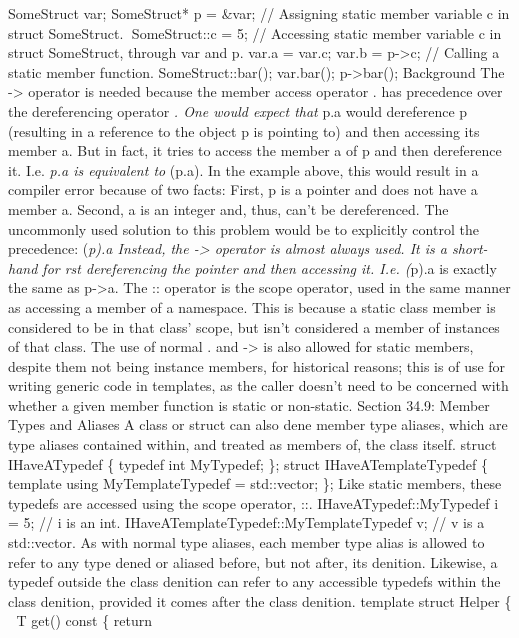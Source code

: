 SomeStruct var; SomeStruct* p = \&var; // Assigning static member
variable c in struct SomeStruct. SomeStruct::c = 5; // Accessing static
member variable c in struct SomeStruct, through var and p. var.a =
var.c; var.b = p-\textgreater c; // Calling a static member function.
SomeStruct::bar(); var.bar(); p-\textgreater bar(); Background The
-\textgreater{} operator is needed because the member access operator .
has precedence over the dereferencing operator \emph{. One would expect
that }p.a would dereference p (resulting in a reference to the object p
is pointing to) and then accessing its member a. But in fact, it tries
to access the member a of p and then dereference it. I.e. \emph{p.a is
equivalent to }(p.a). In the example above, this would result in a
compiler error because of two facts: First, p is a pointer and does not
have a member a. Second, a is an integer and, thus, can't be
dereferenced. The uncommonly used solution to this problem would be to
explicitly control the precedence: (\emph{p).a Instead, the
-\textgreater{} operator is almost always used. It is a short-hand for
rst dereferencing the pointer and then accessing it. I.e. (}p).a is
exactly the same as p-\textgreater a. The :: operator is the scope
operator, used in the same manner as accessing a member of a namespace.
This is because a static class member is considered to be in that class'
scope, but isn't considered a member of instances of that class. The use
of normal . and -\textgreater{} is also allowed for static members,
despite them not being instance members, for historical reasons; this is
of use for writing generic code in templates, as the caller doesn't need
to be concerned with whether a given member function is static or
non-static. Section 34.9: Member Types and Aliases A class or struct can
also dene member type aliases, which are type aliases contained within,
and treated as members of, the class itself. struct IHaveATypedef \{
typedef int MyTypedef; \}; struct IHaveATemplateTypedef \{ template
using MyTemplateTypedef = std::vector; \}; Like static members, these
typedefs are accessed using the scope operator, ::.
IHaveATypedef::MyTypedef i = 5; // i is an int.
IHaveATemplateTypedef::MyTemplateTypedef v; // v is a std::vector. As
with normal type aliases, each member type alias is allowed to refer to
any type dened or aliased before, but not after, its denition. Likewise,
a typedef outside the class denition can refer to any accessible
typedefs within the class denition, provided it comes after the class
denition. template struct Helper \{  T get() const \{ return
